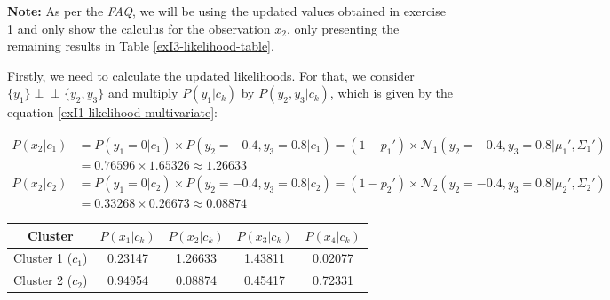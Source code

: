 \documentclass[12pt]{article}
\newcommand{\ind}{\perp\!\!\!\perp}
\begin{document}
\begin{enumerate}[leftmargin=\labelsep]
        \vskip 0.3cm
        \textbf{Note:} As per the \textit{FAQ}, we will be using the updated values obtained in exercise 1 and only show the calculus for the
        observation $x_2$, only presenting the remaining results in Table \ref{exI3-likelihood-table}.

        Firstly, we need to calculate the updated likelihoods. For that, we consider $\{y_1\} \ind \{y_2, y_3\}$ and multiply $P(y_1|c_k)$ by $P(y_2,y_3|c_k)$,
        which is given by the equation \eqref{exI1-likelihood-multivariate}:

        \vskip -0.4cm
        \begingroup
        \addtolength{\jot}{0.5em}
        \begin{align*}
          P(x_2 | c_1) & = P(y_1 = 0 | c_1) \times P(y_2 = -0.4, y_3 = 0.8 | c_1)
          = (1 - p_1') \times \mathcal{N}_1(y_2 = -0.4, y_3 = 0.8 | \mu_1', \Sigma_1') \\
                       & = 0.76596 \times 1.65326 \approx 1.26633                      \\
          P(x_2 | c_2) & = P(y_1 = 0 | c_2) \times P(y_2 = -0.4, y_3 = 0.8 | c_2)
          = (1 - p_2') \times \mathcal{N}_2(y_2 = -0.4, y_3 = 0.8 | \mu_2', \Sigma_2') \\
                       & = 0.33268 \times 0.26673 \approx 0.08874
        \end{align*}
        \endgroup

        \vskip 0.2cm
        \begin{center}
          \captionsetup{type=table}
          \begin{tabular}{c|cccc}
            Cluster                               & $P(x_1 | c_k)$ & $P(x_2 | c_k)$ & $P(x_3 | c_k)$ & $P(x_4 | c_k)$ \\
            \hline
            \colorbox{bmint}{Cluster 1} ($c_1$)   &
            0.23147                               &
            1.26633                               &
            1.43811                               &
            0.02077                                                                                                   \\
            \colorbox{byellow}{Cluster 2} ($c_2$) &
            0.94954                               &
            0.08874                               &
            0.45417                               &
            0.72331                                                                                                   \\
          \end{tabular}
          \label{exI3-likelihood-table}
        \end{center}


\end{enumerate}
\end{document}
